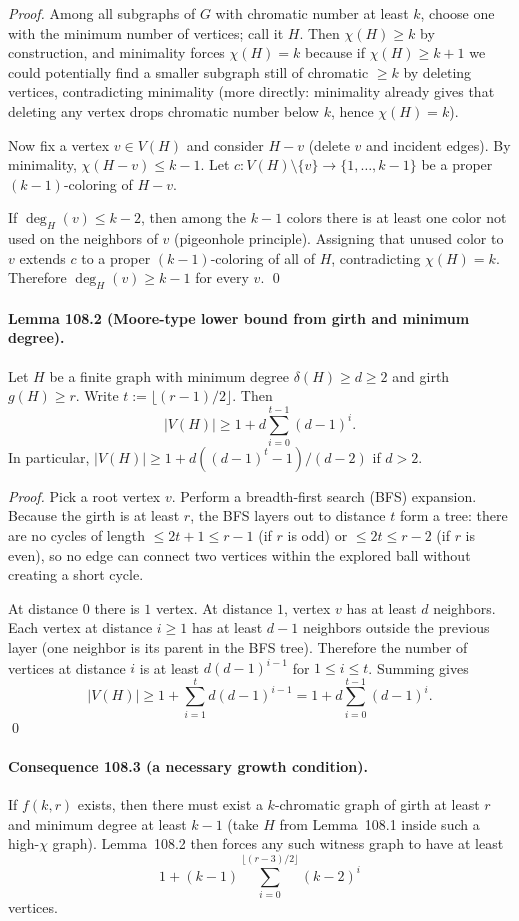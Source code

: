 \emph{Proof.}
Among all subgraphs of $G$ with chromatic number at least $k$, choose one with the minimum number of vertices; call it $H$.  Then $\chi(H)\ge k$ by construction, and minimality forces $\chi(H)=k$ because if $\chi(H)\ge k+1$ we could potentially find a smaller subgraph still of chromatic $\ge k$ by deleting vertices, contradicting minimality (more directly: minimality already gives that deleting any vertex drops chromatic number below $k$, hence $\chi(H)=k$).

Now fix a vertex $v\in V(H)$ and consider $H-v$ (delete $v$ and incident edges).  By minimality, $\chi(H-v)\le k-1$.  Let $c:V(H)\setminus\{v\}\to\{1,\dots,k-1\}$ be a proper $(k-1)$-coloring of $H-v$.

If $\deg_H(v)\le k-2$, then among the $k-1$ colors there is at least one color not used on the neighbors of $v$ (pigeonhole principle).  Assigning that unused color to $v$ extends $c$ to a proper $(k-1)$-coloring of all of $H$, contradicting $\chi(H)=k$.  Therefore $\deg_H(v)\ge k-1$ for every $v$. \qed

\paragraph{Lemma 108.2 (Moore-type lower bound from girth and minimum degree).}
Let $H$ be a finite graph with minimum degree $\delta(H)\ge d\ge2$ and girth $g(H)\ge r$.
Write $t:=\lfloor (r-1)/2\rfloor$.  Then
\[
|V(H)|\ge 1+d\sum_{i=0}^{t-1}(d-1)^i.
\]
In particular, $|V(H)|\ge 1+d((d-1)^t-1)/(d-2)$ if $d>2$.

\emph{Proof.}
Pick a root vertex $v$.  Perform a breadth-first search (BFS) expansion.  Because the girth is at least $r$, the BFS layers out to distance $t$ form a tree: there are no cycles of length $\le 2t+1\le r-1$ (if $r$ is odd) or $\le 2t\le r-2$ (if $r$ is even), so no edge can connect two vertices within the explored ball without creating a short cycle.

At distance $0$ there is $1$ vertex.  At distance $1$, vertex $v$ has at least $d$ neighbors.  Each vertex at distance $i\ge1$ has at least $d-1$ neighbors outside the previous layer (one neighbor is its parent in the BFS tree).  Therefore the number of vertices at distance $i$ is at least $d(d-1)^{i-1}$ for $1\le i\le t$.  Summing gives
\[
|V(H)|\ge 1+\sum_{i=1}^t d(d-1)^{i-1} = 1+d\sum_{i=0}^{t-1}(d-1)^i.
\]
\qed

\paragraph{Consequence 108.3 (a necessary growth condition).}
If $f(k,r)$ exists, then there must exist a $k$-chromatic graph of girth at least $r$ and minimum degree at least $k-1$ (take $H$ from Lemma~108.1 inside such a high-$\chi$ graph).  Lemma~108.2 then forces any such witness graph to have at least
\[
1+(k-1)\sum_{i=0}^{\lfloor (r-3)/2\rfloor}(k-2)^i
\]
vertices.

